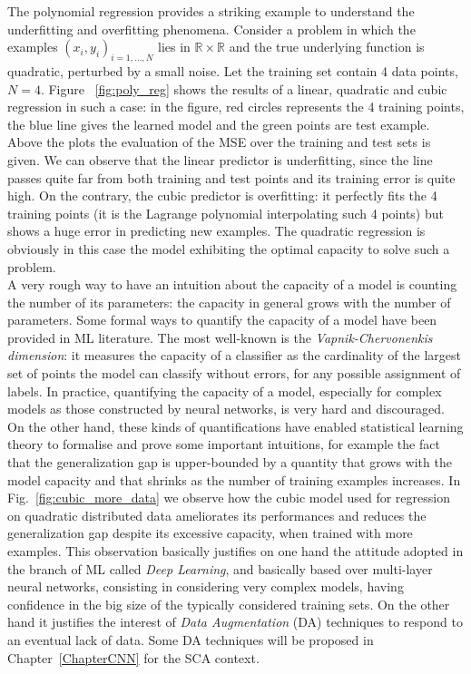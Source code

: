The polynomial regression provides a striking example to understand the underfitting and overfitting phenomena. Consider a problem in which the examples $(x_i,y_i)_{i=1,\dots,N}$ lies in $\mathbb{R} \times \mathbb{R}$ and the true underlying function is quadratic, perturbed by a small noise. Let the training set contain 4 data points, \ie $N=4$. Figure ~\ref{fig:poly_reg} shows the results of a linear, quadratic and cubic regression in such a case: in the figure, red circles represents the 4 training points, the blue line gives the learned model and the green points are test example. Above the plots the evaluation of the MSE over the training and test sets is given. We can observe that the linear predictor is underfitting, since the line passes quite far from both training and test points and its training error is quite high. On the contrary, the cubic predictor is overfitting: it perfectly fits the 4 training points (it is the Lagrange polynomial interpolating such 4 points) but shows a huge error in predicting new examples. The quadratic regression is obviously in this case the model exhibiting the optimal capacity to solve such a problem. \\

A very rough way to have an intuition about the capacity of a model is counting the number of its parameters: the capacity in general grows with the number of parameters. Some formal ways to quantify the capacity of a model have been provided in ML literature. The most well-known is the \emph{Vapnik-Chervonenkis dimension}: it measures the capacity of a classifier as the cardinality of the largest set of points the model can classify without errors, for any possible assignment of labels. In practice, quantifying the capacity of a model, especially for complex models as those constructed by neural networks, is very hard and discouraged. On the other hand, these kinds of quantifications have enabled statistical learning theory to formalise and prove some important intuitions, for example the fact that the generalization gap is upper-bounded by a quantity that grows with the model capacity and that shrinks as the number of training examples increases. In Fig.~\ref{fig:cubic_more_data} we observe how the cubic model used for regression on quadratic distributed data ameliorates its performances and reduces the generalization gap despite its excessive capacity, when trained with more examples. This observation basically justifies on one hand the attitude adopted in the branch of ML called \emph{Deep Learning}, and basically based over multi-layer neural networks, consisting in considering very complex models, having confidence in the big size of the typically considered training sets. On the other hand it justifies the interest of \emph{Data Augmentation} (DA) techniques \cite{simard2003best} to respond to an eventual lack of data. Some DA techniques will be proposed in Chapter~\ref{ChapterCNN} for the SCA context.

